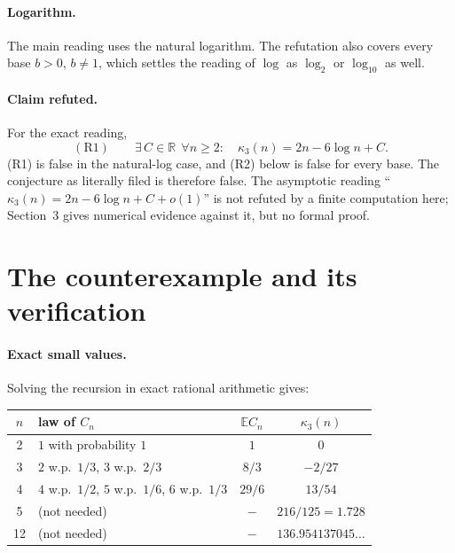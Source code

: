 \documentclass[11pt]{article}
\theoremstyle{definition}
\theoremstyle{plain}
\begin{document}
\paragraph{Logarithm.} The main reading uses the natural logarithm. The refutation also covers every base $b>0$, $b\ne 1$,
which settles the reading of $\log$ as $\log_2$ or $\log_{10}$ as well.

\paragraph{Claim refuted.} For the exact reading,
\[
  (\mathrm{R}1)\qquad \exists\, C\in\mathbb{R}\ \ \forall n\ge 2:\quad \kappa_3(n)=2n-6\log n+C .
\]
(R1) is false in the natural-log case, and (R2) below is false for every base. The conjecture as literally filed is
therefore false. The asymptotic reading ``$\kappa_3(n)=2n-6\log n+C+o(1)$'' is not refuted by a finite computation here;
Section~3 gives numerical evidence against it, but no formal proof.

\section{The counterexample and its verification}

\paragraph{Exact small values.} Solving the recursion in exact rational arithmetic gives:
\begin{center}
\begin{tabular}{c l c c}
\hline
$n$ & law of $C_n$ & $\mathbb{E}C_n$ & $\kappa_3(n)$ \\
\hline
2 & $1$ with probability $1$ & $1$ & $0$ \\
3 & $2$ w.p.\ $1/3$, $3$ w.p.\ $2/3$ & $8/3$ & $-2/27$ \\
4 & $4$ w.p.\ $1/2$, $5$ w.p.\ $1/6$, $6$ w.p.\ $1/3$ & $29/6$ & $13/54$ \\
5 & (not needed) & $-$ & $216/125 = 1.728$ \\
12 & (not needed) & $-$ & $136.954137045\ldots$ \\
\hline
\end{tabular}
\end{center}
\end{document}
